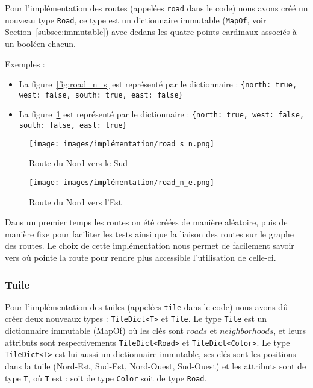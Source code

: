 Pour l'implémentation des routes (appelées \texttt{road} dans le code) nous avons créé un nouveau type \texttt{Road}, ce type est un dictionnaire immutable (\texttt{MapOf}, voir Section~\ref{subsec:immutable}) avec dedans les quatre points cardinaux associés à un booléen chacun.

Exemples : \\
\begin{itemize}
    \item La figure~\ref{fig:road_n_s} est représenté par le dictionnaire : \texttt{\{north: true, west: false, south: true, east: false\}}
    \item La figure~\ref{fig:road_n_e} est représenté par le dictionnaire : \texttt{\{north: true, west: false, south: false, east: true\}}
\end{itemize}

\begin{figure}[h]
    \centering
    \begin{minipage}{0.45\textwidth}
        \centering
        \texttt{[image: images/implémentation/road\_s\_n.png]}
        \caption{Route du Nord vers le Sud}
        \label{fig:road_n_s}
    \end{minipage}\hfill
    \begin{minipage}{0.45\textwidth}
        \centering
        \texttt{[image: images/implémentation/road\_n\_e.png]}
        \caption{Route du Nord vers l'Est}
        \label{fig:road_n_e}
    \end{minipage}
\end{figure}

Dans un premier temps les routes on été créées de manière aléatoire, puis de manière fixe pour faciliter les tests ainsi que la liaison des routes sur le graphe des routes.
Le choix de cette implémentation nous permet de facilement savoir vers où pointe la route pour rendre plus accessible l'utilisation de celle-ci.

\subsubsection{Tuile}

Pour l'implémentation des tuiles (appelées \texttt{tile} dans le code) nous avons dû créer deux nouveaux types : \texttt{TileDict<T>} et \texttt{Tile}. Le type \texttt{Tile} est un dictionnaire immutable (MapOf) où les clés sont $roads$ et $neighborhoods$, et leurs attributs sont respectivements \texttt{TileDict<Road>} et \texttt{TileDict<Color>}.
Le type \texttt{TileDict<T>} est lui aussi un dictionnaire immutable, ses clés sont les positions dans la tuile (Nord-Est, Sud-Est, Nord-Ouest, Sud-Ouest) et les attributs sont de type \texttt{T}, où \texttt{T} est : soit de type \texttt{Color} soit de type \texttt{Road}.

